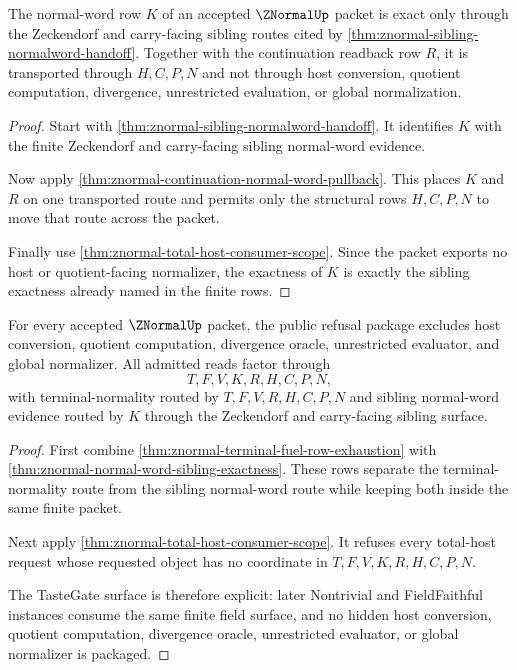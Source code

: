 \begin{theorem}
\label{thm:znormal-normal-word-sibling-exactness}
The normal-word row $K$ of an accepted $\ZNormalUp$ packet is exact only
through the Zeckendorf and carry-facing sibling routes cited by
\autoref{thm:znormal-sibling-normalword-handoff}. Together with the
continuation readback row $R$, it is transported through $H,C,P,N$ and not
through host conversion, quotient computation, divergence, unrestricted
evaluation, or global normalization.
\end{theorem}
\begin{proof}
Start with \autoref{thm:znormal-sibling-normalword-handoff}. It identifies $K$
with the finite Zeckendorf and carry-facing sibling normal-word evidence.

Now apply \autoref{thm:znormal-continuation-normal-word-pullback}. This places
$K$ and $R$ on one transported route and permits only the structural rows
$H,C,P,N$ to move that route across the packet.

Finally use \autoref{thm:znormal-total-host-consumer-scope}. Since the packet
exports no host or quotient-facing normalizer, the exactness of $K$ is exactly
the sibling exactness already named in the finite rows.
\end{proof}

\begin{theorem}
\label{thm:znormal-total-host-refusal-package}
For every accepted $\ZNormalUp$ packet, the public refusal package excludes
host conversion, quotient computation, divergence oracle, unrestricted
evaluator, and global normalizer. All admitted reads factor through
$$
T,F,V,K,R,H,C,P,N,
$$
with terminal-normality routed by $T,F,V,R,H,C,P,N$ and sibling normal-word
evidence routed by $K$ through the Zeckendorf and carry-facing sibling surface.
\end{theorem}
\begin{proof}
First combine \autoref{thm:znormal-terminal-fuel-row-exhaustion} with
\autoref{thm:znormal-normal-word-sibling-exactness}. These rows separate the
terminal-normality route from the sibling normal-word route while keeping both
inside the same finite packet.

Next apply \autoref{thm:znormal-total-host-consumer-scope}. It refuses every
total-host request whose requested object has no coordinate in
$T,F,V,K,R,H,C,P,N$.

The TasteGate surface is therefore explicit: later Nontrivial and
FieldFaithful instances consume the same finite field surface, and no hidden
host conversion, quotient computation, divergence oracle, unrestricted
evaluator, or global normalizer is packaged.
\end{proof}

